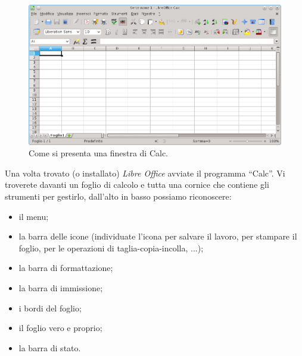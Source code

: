 \begin{inaccessibleblock}
 \begin{figure}[htbp]
\centering
\begin{inaccessibleblock}
 \includegraphics[scale=0.6]{img/00_calc.png}
\end{inaccessibleblock}
\caption{Come si presenta una finestra di Calc.}
\end{figure}
\end{inaccessibleblock}

Una volta trovato (o installato) \emph{Libre Office} avviate il programma ``Calc''.
Vi troverete davanti un foglio di calcolo e tutta una cornice che contiene
gli strumenti per gestirlo, dall'alto in basso possiamo riconoscere:

\begin{itemize}
\item {} 
il menu;
\item {}
la barra delle icone (individuate l'icona per salvare il lavoro,
per stampare il foglio, per le operazioni di taglia-copia-incolla, ...);
\item {} 
la barra di formattazione;
\item {} 
la barra di immissione;
\item {} 
i bordi del foglio;
\item {} 
il foglio vero e proprio;
\item {} 
la barra di stato.
\end{itemize}

